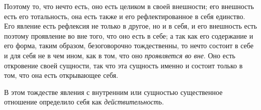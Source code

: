 Поэтому то, что нечто есть, оно есть целиком в своей внешности; его
внешность есть его тотальность, она есть также и его рефлектированное в
себя единство. Его явление есть рефлексия не только в другое, но и в себя,
и его внешность есть поэтому проявление во вне того, что оно есть в себе; а
так как его содержание и его форма, таким образом, безоговорочно
тождественны, то нечто состоит в себе и для себя не в чем ином, как в том,
что оно {\em проявляется во вне}. Оно есть откровение
своей сущности, так что эта сущность именно и состоит только в том, что она
есть открывающее себя.

В этом тождестве явления с внутренним или сущностью существенное отношение
определило себя как {\em действительность}.

